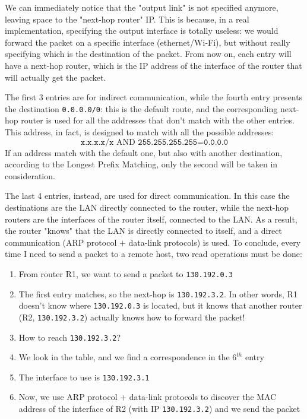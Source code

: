 \noindent We can immediately notice that the "output link" is not specified anymore, leaving space to the "next-hop router" IP. This is because, in a real implementation, specifying the output interface is totally useless: we would forward the packet on a specific interface (ethernet/Wi-Fi), but without really specifying which is the destination of the packet. From now on, each entry will have a next-hop router, which is the IP address of the interface of the router that will actually get the packet.

The first 3 entries are for indirect communication, while the fourth entry presents the destination \texttt{0.0.0.0/0}: this is the default route, and the corresponding next-hop router is used for all the addresses that don't match with the other entries. This address, in fact, is designed to match with all the possible addresses:
\[\texttt{x.x.x.x/x}\text{ AND }\texttt{255.255.255.255} = \texttt{0.0.0.0}\]
\noindent If an address match with the default one, but also with another destination, according to the Longest Prefix Matching, only the second will be taken in consideration.

The last 4 entries, instead, are used for direct communication. In this case the destinations are the LAN directly connected to the router, while the next-hop routers are the interfaces of the router itself, connected to the LAN. As a result, the router "knows" that the LAN is directly connected to itself, and a direct communication (ARP protocol + data-link protocols) is used. To conclude, every time I need to send a packet to a remote host, two read operations must be done:
\begin{enumerate}
    \item From router R1, we want to send a packet to \texttt{130.192.0.3}
    \item The first entry matches, so the next-hop is \texttt{130.192.3.2}. In other words, R1 doesn't know where \texttt{130.192.0.3} is located, but it knows that another router (R2, \texttt{130.192.3.2}) actually knows how to forward the packet!
    \item How to reach \texttt{130.192.3.2}?
    \item We look in the table, and we find a correspondence in the \(6^{th}\) entry
    \item The interface to use is \texttt{130.192.3.1}
    \item Now, we use ARP protocol + data-link protocols to discover the MAC address of the interface of R2 (with IP \texttt{130.192.3.2}) and we send the packet
\end{enumerate}

